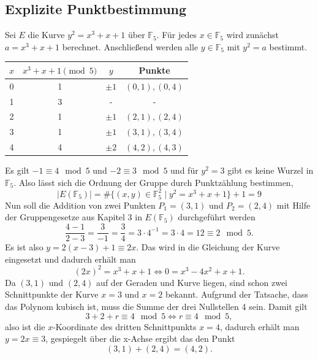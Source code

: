 \subsection{Explizite Punktbestimmung}
Sei $E$ die Kurve $y^2=x^3+x+1$ über $\mathbb{F}_5$. Für jedes $x\in\mathbb F_5$ wird zunächst $a=x^3+x+1$ berechnet. Anschließend werden alle $y\in\mathbb F_5$ mit $y^2=a$ bestimmt.
\begin{center}
    \begin{tabular}{c|c|c|c}
        $x$ & $x^3+x+1\pmod 5$ & $y$    & Punkte         \\
        \hline
        0   & 1                & $\pm1$ & $(0,1), (0,4)$ \\
        1   & 3                & -      & -              \\
        2   & 1                & $\pm1$ & $(2,1), (2,4)$ \\
        3   & 1                & $\pm1$ & $(3,1), (3,4)$ \\
        4   & 4                & $\pm2$ & $(4,2), (4,3)$ \\
    \end{tabular}
\end{center}
Es gilt $-1\equiv 4 \mod 5$ und $ -2\equiv 3 \mod 5$ und für $y^2=3$ gibt es keine Wurzel in $\mathbb{F}_5$. Also lässt sich die Ordnung der Gruppe durch Punktzählung bestimmen,
\[
    \mid E(\mathbb{F}_5)\mid = \# \{(x,y)\in \mathbb{F}_5^2\mid y^2=x^3+x+1\}+1 = 9
\]
Nun soll die Addition von zwei Punkten $P_1=(3,1)$ und $P_2=(2,4)$ mit Hilfe der Gruppengesetze aus Kapitel 3 in $E(\mathbb{F}_5)$ durchgeführt werden
\[
    \frac{4-1}{2-3}=\frac{3}{-1}=\frac{3}{4}=3\cdot4^{-1} =3\cdot 4=12  \equiv 2 \mod 5.
\]
Es ist also $y=2(x-3)+1\equiv 2x$. Das wird in die Gleichung der Kurve eingesetzt und dadurch erhält man
\[
    {(2x)}^2=x^3+x+1\Leftrightarrow 0 = x^3-4x^2+x+1.
\]
Da $(3,1)$ und $(2,4)$ auf der Geraden und Kurve liegen, sind schon zwei Schnittpunkte der Kurve $x=3$ und $x=2$ bekannt. Aufgrund der Tatsache, dass das Polynom kubisch ist, muss die Summe der drei Nullstellen 4 sein. Damit gilt
\[
    3+2+r \equiv 4 \mod 5 \Leftrightarrow r\equiv 4 \mod 5,
\]
also ist die $x$-Koordinate des dritten Schnittpunkts $x=4$, dadurch erhält man $y=2x\equiv 3$, gespiegelt über die x-Achse ergibt das den Punkt
\[
    (3,1)+(2,4)=(4,2).
\]

